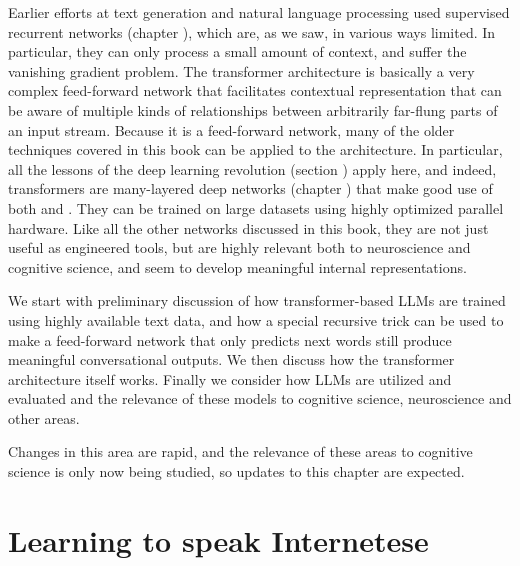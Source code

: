 Earlier efforts at text generation and natural language processing used supervised recurrent networks (chapter ), which are, as we saw, in various ways limited. In particular, they can only process a small amount of context, and suffer the vanishing gradient problem. The transformer architecture is basically a very complex feed-forward network that facilitates contextual representation that can be aware of multiple kinds of relationships between arbitrarily far-flung parts of an input stream. Because it is a feed-forward network, many of the older techniques covered in this book can be applied to the architecture. In particular, all the lessons of the deep learning revolution (section ) apply here, and indeed, transformers are many-layered deep networks (chapter ) that make good use of both  and . They can be trained on large datasets using highly optimized parallel hardware. Like all the other networks discussed in this book, they are not just useful as engineered tools, but are highly relevant both to neuroscience and cognitive science, and seem to develop meaningful internal representations. 

We start with preliminary discussion of how transformer-based LLMs are trained using highly available text data, and how a special recursive trick can be used to make a feed-forward network that only predicts next words still produce meaningful conversational outputs. We then discuss how the transformer architecture itself works. Finally we consider how LLMs are utilized and evaluated and the relevance of these models to cognitive science, neuroscience and other areas.

Changes in this area are rapid, and the relevance of these areas to cognitive science is only now being studied, so updates to this chapter are expected.

\section{Learning to speak Internetese}

